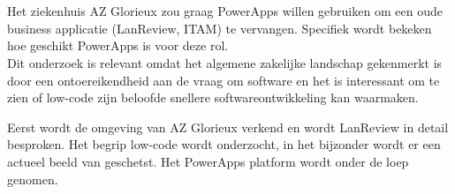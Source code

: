 
%
%

%



\chapter*{}

Het ziekenhuis AZ Glorieux zou graag PowerApps willen gebruiken om een oude business applicatie (LanReview, ITAM) te vervangen. Specifiek wordt bekeken hoe geschikt PowerApps is voor deze rol.\\
Dit onderzoek is relevant omdat het algemene zakelijke landschap gekenmerkt is door een ontoereikendheid aan de vraag om software en het is interessant om te zien of low-code zijn beloofde snellere softwareontwikkeling kan waarmaken. 

Eerst wordt de omgeving van AZ Glorieux verkend en wordt LanReview in detail besproken. Het begrip low-code wordt onderzocht, in het bijzonder wordt er een actueel beeld van geschetst. Het PowerApps platform wordt onder de loep genomen.

